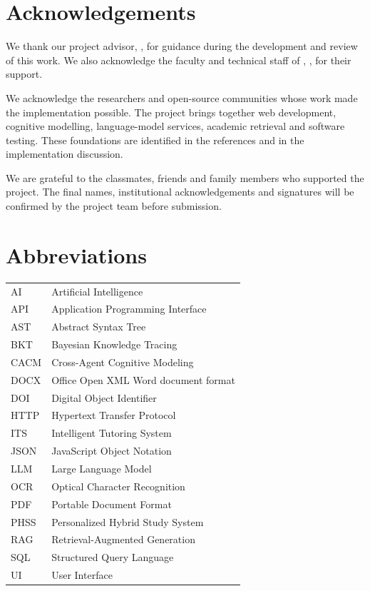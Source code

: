 \documentclass[a4paper,12pt]{report}
\begin{document}
\hypersetup{pageanchor=false}

\clearpage
{}\hypersetup{pageanchor=true}
\tableofcontents
\chapter*{Acknowledgements}
We thank our project advisor, \GuideName, for guidance during the development and review of this work. We also acknowledge the faculty and technical staff of \DepartmentName, \UniversityName, for their support.

We acknowledge the researchers and open-source communities whose work made the implementation possible. The project brings together web development, cognitive modelling, language-model services, academic retrieval and software testing. These foundations are identified in the references and in the implementation discussion.

We are grateful to the classmates, friends and family members who supported the project. The final names, institutional acknowledgements and signatures will be confirmed by the project team before submission.
\vspace{1cm}
\begin{flushright}\TeamNames\end{flushright}
\clearpage
\listoffigures
{}
\clearpage
\listoftables
{}
\clearpage
\chapter*{Abbreviations}
\begin{longtable}{P{0.20\textwidth}P{0.73\textwidth}}
AI & Artificial Intelligence\\
API & Application Programming Interface\\
AST & Abstract Syntax Tree\\
BKT & Bayesian Knowledge Tracing\\
CACM & Cross-Agent Cognitive Modeling\\
DOCX & Office Open XML Word document format\\
DOI & Digital Object Identifier\\
HTTP & Hypertext Transfer Protocol\\
ITS & Intelligent Tutoring System\\
JSON & JavaScript Object Notation\\
LLM & Large Language Model\\
OCR & Optical Character Recognition\\
PDF & Portable Document Format\\
PHSS & Personalized Hybrid Study System\\
RAG & Retrieval-Augmented Generation\\
SQL & Structured Query Language\\
UI & User Interface\\
\end{longtable}
\clearpage
\end{document}
